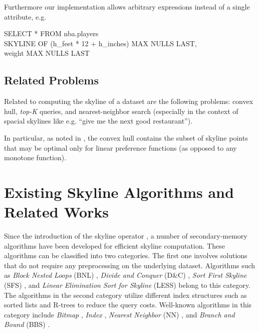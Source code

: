 Furthermore our implementation allows arbitrary expressions instead of
a single attribute, e.g.

\begin{sql}
SELECT * FROM nba.players \\
SKYLINE OF (h\_feet * 12 + h\_inches) MAX NULLS LAST, \\
weight MAX NULLS LAST
\end{sql}


\section{Related Problems}
Related to computing the skyline of a dataset are the following problems:
convex hull, \emph{top-K} queries, and nearest-neighbor search
(especially in the context of spacial skylines like e.g. ``give me the
next good restaurant'').

In particular, as noted in \citep{Papadias2005}, the convex hull
contains the subset of skyline points that may be optimal only for
linear preference functions (as opposed to any monotone function).






\chapter{Existing Skyline Algorithms and Related Works}
\label{chap:relatedworks}

Since the introduction of the skyline operator \citep{Borzsonyi2001}, a
number of secondary-memory algorithms have been developed for
efficient skyline computation. These algorithms can be classified into
two categories. The first one involves solutions that do not require
any preprocessing on the underlying dataset. Algorithms such as
{\em Block Nested Loops} (BNL) \citep{Borzsonyi2001}, 
{\em Divide and Conquer} (D\&C) \citep{Borzsonyi2001}, 
{\em Sort First Skyline} (SFS) \citep{Chomicki2003}, and
{\em Linear Elimination Sort for Skyline} (LESS) \citep{Godfrey2005}
belong to this category.
The algorithms in the second category utilize different index structures
such as sorted lists and R-trees to reduce the query costs.
Well-known algorithms in this category include 
{\em Bitmap} \citep{Tan2001}, 
{\em Index} \citep{Tan2001},
{\em Nearest Neighbor} (NN) \citep{Kossmann2002}, and
{\em Branch and Bound} (BBS) \citep{Papadias2003, Papadias2005}.

